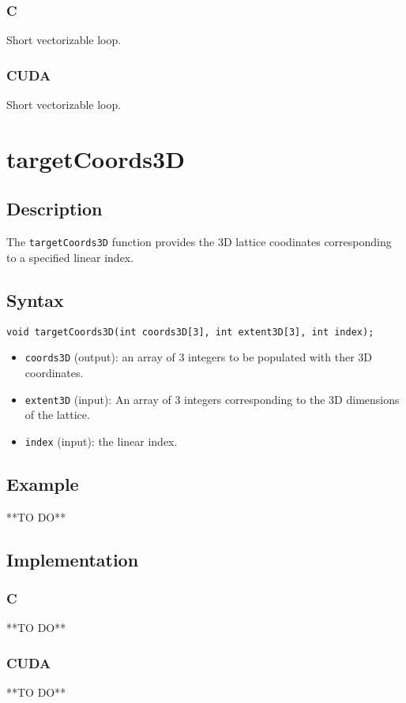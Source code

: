 \subsubsection{C}
Short vectorizable loop.
\subsubsection{CUDA}
Short vectorizable loop.

\newpage
\section{targetCoords3D}

\subsection{Description}

The \verb+targetCoords3D+ function provides the 3D lattice coodinates corresponding to a specified linear index.

\subsection{Syntax}
\begin{verbatim}
void targetCoords3D(int coords3D[3], int extent3D[3], int index);
\end{verbatim}

\begin{itemize}
\item \verb+coords3D+ (output): an array of 3 integers to be populated with ther 3D coordinates.
\item \verb+extent3D+ (input): An array of 3 integers corresponding to the 3D dimensions of the lattice.
\item \verb+index+ (input): the linear index. 

\end{itemize}


\subsection{Example}
**TO DO**
\subsection{Implementation}
\subsubsection{C}
**TO DO**
\subsubsection{CUDA}
**TO DO**

